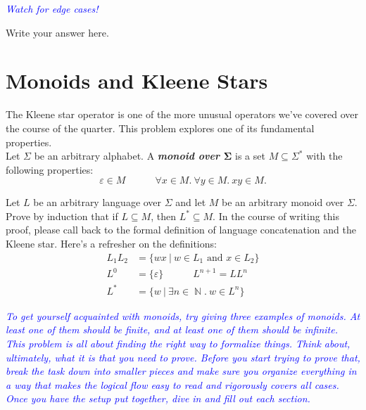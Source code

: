 \documentclass{article}
\renewcommand{\(}{\left(}
\renewcommand{\)}{\right)}
\DeclareMathOperator{\N}{\mathbb{N}}
\theoremstyle{plain}
\theoremstyle{plain}
\theoremstyle{definition}
\renewcommand{\emph}[1]{\textit{\textbf{#1}}}
\newcommand{\annotate}[1]{\textit{\textcolor{blue}{#1}}}
\begin{document}
\annotate{Watch for edge cases!}
    
\begin{shaded}
Write your answer here.
\end{shaded}

\pagebreak

\section{Monoids and Kleene Stars}

The Kleene star operator is one of the more unusual operators we've covered over the course of the quarter. This problem explores one of its fundamental properties. \\

Let $\Sigma$ be an arbitrary alphabet. A \emph{monoid over $\mathbf{\Sigma}$} is a set $M \subseteq \Sigma^*$ with the following properties:
\begin{equation*}
\varepsilon \in M \quad\quad\quad \forall x \in M.\ \forall y \in M.\ xy \in M.
\end{equation*}

Let $L$ be an arbitrary language over $\Sigma$ and let $M$ be an arbitrary monoid over $\Sigma$. Prove by induction that if $L \subseteq M$, then $L^* \subseteq M$. In the course of writing this proof, please call back to the formal definition of language concatenation and the Kleene star. Here's a refresher on the definitions:
    \begin{align*}
    L_1L_2 &= \{ wx\ |\ w \in L_1\text{ and }x \in L_2 \} \\
    L^0 &= \{\varepsilon\} \quad\quad\quad L^{n+1} = LL^n \\
    L^* &= \{ w\ |\ \exists n \in \N.\ w \in L^n \}
    \end{align*}
    
\annotate{To get yourself acquainted with monoids, try giving three examples of monoids. At least one of them
should be finite, and at least one of them should be infinite.} \\

\annotate{This problem is all about finding the right way to formalize things. Think about, ultimately, what it is that
you need to prove. Before you start trying to prove that, break the task down into smaller pieces and make
sure you organize everything in a way that makes the logical flow easy to read and rigorously covers all
cases. Once you have the setup put together, dive in and fill out each section.} \\
    
\end{document}
